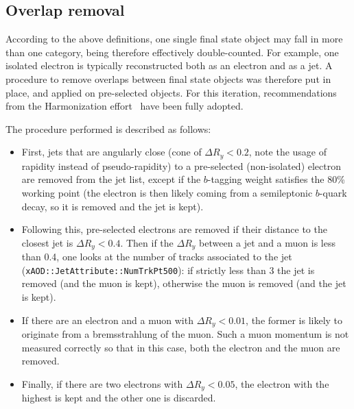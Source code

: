 \subsection{Overlap removal}
\label{sec:objects_overlap_removal}

According to the above definitions, one single final state object may fall in more than one category, being therefore effectively double-counted. 
For example, one isolated electron is typically reconstructed both as an electron and as a jet. A procedure to remove overlaps between final state objects was therefore put in place, and applied on pre-selected objects. 
For this iteration, recommendations from the Harmonization effort~\cite{Harmonization} have been fully adopted. 

The procedure performed is described as follows:

\begin{itemize}

\item First, jets that are angularly close (cone of $\Delta R_y < 0.2$, note the usage of rapidity instead of pseudo-rapidity) 
to a pre-selected (non-isolated) electron are removed from the jet list, 
except if the $b$-tagging weight satisfies the 80\% working point (the electron is then likely coming from a semileptonic $b$-quark decay, so it is removed and the jet is kept). 

\item Following this, pre-selected electrons are removed if their distance to the closest jet is $\Delta R_y < 0.4$. 
Then if the $\Delta R_y$ between a jet and a muon is less than 0.4, 
one looks at the number of tracks associated to the jet ({\tt xAOD::JetAttribute::NumTrkPt500}): 
if strictly less than 3 the jet is removed (and the muon is kept),  
otherwise the muon is removed (and the jet is kept).
 
\item If there are an electron and a muon with $\Delta R_y<0.01$, the former is likely to originate from a bremsstrahlung 
of the muon. Such a muon momentum is not measured correctly so that in this case, both the electron
and the muon are removed.

\item Finally, if there are two electrons with $\Delta R_y<0.05$,  the electron with the highest \pT is kept and the other one is discarded.

\end{itemize}

